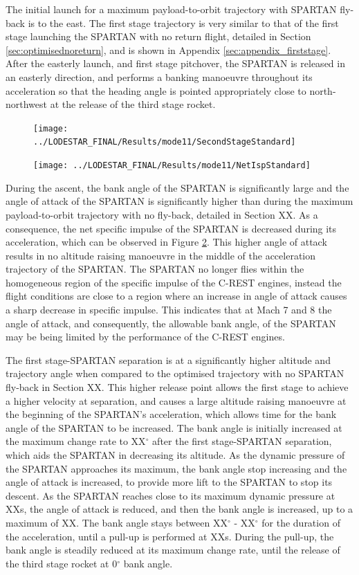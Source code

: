  The initial launch for a maximum payload-to-orbit trajectory with SPARTAN fly-back is to the east.
 The first stage trajectory is very similar to that of the first stage launching the SPARTAN with no return flight, detailed in Section \ref{sec:optimisednoreturn}, and is shown in Appendix \ref{sec:appendix_firststage}. 
 After the easterly launch, and first stage pitchover, the SPARTAN is released in an easterly direction, and performs a banking manoeuvre throughout its acceleration so that the heading angle is pointed appropriately close to north-northwest at the release of the third stage rocket. 
\begin{figure}[ht!]
\centering
\texttt{[image: ../LODESTAR\_FINAL/Results/mode11/SecondStageStandard]}
\caption{}
\label{fig:SecondStageStandard}
\end{figure}
\begin{figure}[ht!]
\centering
\texttt{[image: ../LODESTAR\_FINAL/Results/mode11/NetIspStandard]}
\caption{}
\label{fig:NetIspStandard}
\end{figure}
During the ascent, the bank angle of the SPARTAN is significantly large and the angle of attack of the SPARTAN is significantly higher than during the maximum payload-to-orbit trajectory with no fly-back, detailed in Section XX.
As a consequence, the net specific impulse of the SPARTAN is decreased during its acceleration, which can be observed in Figure \ref{fig:NetIspStandard}. This higher angle of attack results in no altitude raising manoeuvre in the middle of the acceleration trajectory of the SPARTAN. The SPARTAN no longer flies within the homogeneous region of the specific impulse of the C-REST engines, instead the flight conditions are close to a region where an increase in angle of attack causes a sharp decrease in specific impulse. 
This indicates that at Mach 7 and 8 the angle of attack, and consequently, the allowable bank angle, of the SPARTAN may be being limited by the performance of the C-REST engines. 

The first stage-SPARTAN separation is at a significantly higher altitude and trajectory angle when compared to the optimised trajectory with no SPARTAN fly-back in Section XX. This higher release point allows the first stage to achieve a higher velocity at separation, and causes a large altitude raising manoeuvre at the beginning of the SPARTAN's acceleration, which allows time for the bank angle of the SPARTAN to be increased. 
 The bank angle is initially increased at the maximum change rate to XX$^\circ$ after the first stage-SPARTAN separation, which aids the SPARTAN in decreasing its altitude. As the dynamic pressure of the SPARTAN approaches its maximum, the bank angle stop increasing and the angle of attack is increased, to provide more lift to the SPARTAN to stop its descent. 
As the SPARTAN reaches close to its maximum dynamic pressure at XXs, the angle of attack is reduced, and then the bank angle is increased, up to a maximum of XX. 
 The bank angle stays between XX$^\circ$ - XX$^\circ$ for the duration of the acceleration, until a pull-up is performed at XXs. During the pull-up, the bank angle is steadily reduced at its maximum change rate, until the release of the third stage rocket at 0$^\circ$ bank angle. 

